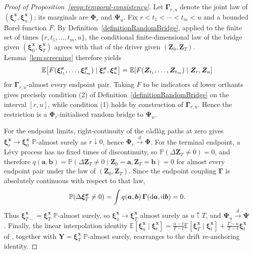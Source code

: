 \documentclass{article}
\newcommand{\levy}{{L\'evy }}
\def\P{\mathbb{P}}
\def\E{\mathbb{E}}
\def\dd{\mathrm{d}}
\def\xib{\boldsymbol{\xi}}
\theoremstyle{definition}
\begin{document}
\begin{proof}[Proof of Proposition~\ref{prop:temporal-consistency}]
Let $\boldsymbol{\Gamma}_{r,u}$ denote the joint law of $(\xib^{\boldsymbol{x}}_r,\xib^{\boldsymbol{x}}_u)$; its marginals are $\boldsymbol{\Phi}_r$ and $\boldsymbol{\Psi}_u$. Fix $r<t_1<\cdots<t_m<u$ and a bounded Borel function $F$. By Definition~\ref{definitionRandomBridge}, applied to the finite set of times $\{r,t_1,\ldots,t_m,u\}$, the conditional finite-dimensional law of the bridge given $(\xib^{\boldsymbol{x}}_0,\xib^{\boldsymbol{x}}_T)$ agrees with that of the driver given $(\boldsymbol{Z}_0,\boldsymbol{Z}_T)$. Lemma~\ref{lem:screening} therefore yields
\begin{align}
\E\!\left[
F(\xib^{\boldsymbol{x}}_{t_1},\ldots,\xib^{\boldsymbol{x}}_{t_m})
\mid
\xib^{\boldsymbol{x}}_r,\xib^{\boldsymbol{x}}_u
\right]
=
\E\!\left[
F(\boldsymbol{Z}_{t_1},\ldots,\boldsymbol{Z}_{t_m})
\mid
\boldsymbol{Z}_r,\boldsymbol{Z}_u
\right] \notag
\end{align}
for $\boldsymbol{\Gamma}_{r,u}$-almost every endpoint pair. Taking $F$ to be indicators of lower orthants gives precisely condition (2) of Definition~\ref{definitionRandomBridge} on the interval $[r,u]$, while condition (1) holds by construction of $\boldsymbol{\Gamma}_{r,u}$. Hence the restriction is a $\boldsymbol{\Phi}_r$-initialised random bridge to $\boldsymbol{\Psi}_u$.

For the endpoint limits, right-continuity of the c\`adl\`ag paths at zero gives $\xib^{\boldsymbol{x}}_r\to\xib^{\boldsymbol{x}}_0$ $\P$-almost surely as $r\downarrow0$, hence $\boldsymbol{\Phi}_r\xrightarrow{d}\boldsymbol{\Phi}$. For the terminal endpoint, a \levy process has no fixed times of discontinuity, so $\P(\Delta\boldsymbol{Z}_T\ne0)=0$, and therefore $q(\boldsymbol{a},\boldsymbol{b}) = \P(\Delta\boldsymbol{Z}_T\ne0\mid \boldsymbol{Z}_0=\boldsymbol{a},\boldsymbol{Z}_T=\boldsymbol{b}) = 0$ for almost every endpoint pair under the law of $(\boldsymbol{Z}_0, \boldsymbol{Z}_T)$. Since the endpoint coupling $\boldsymbol{\Gamma}$ is absolutely continuous with respect to that law,
\begin{align}
\P(\Delta\xib^{\boldsymbol{x}}_T\ne0)
=
\int q(\boldsymbol{a},\boldsymbol{b})\,
\boldsymbol{\Gamma}(\dd\boldsymbol{a},\dd\boldsymbol{b})
=0. \notag
\end{align}
Thus $\xib^{\boldsymbol{x}}_{T-}=\xib^{\boldsymbol{x}}_T$ $\P$-almost surely, so $\xib^{\boldsymbol{x}}_u\to\xib^{\boldsymbol{x}}_T$ almost surely as $u\uparrow T$, and $\boldsymbol{\Psi}_u\xrightarrow{d}\boldsymbol{\Psi}$. Finally, the linear interpolation identity $\E[\xib^{\boldsymbol{x}}_u\mid\xib^{\boldsymbol{x}}_t] = \frac{u-t}{T-t}\E[\xib^{\boldsymbol{x}}_T\mid\xib^{\boldsymbol{x}}_t] + \frac{T-u}{T-t}\xib^{\boldsymbol{x}}_t$ of \cite[Corollary~2.10]{hoylehughstonmacrina_2011}, together with $\boldsymbol{Y}=\xib^{\boldsymbol{x}}_T$ $\P$-almost surely, rearranges to the drift re-anchoring identity.
\end{proof}
\end{document}

